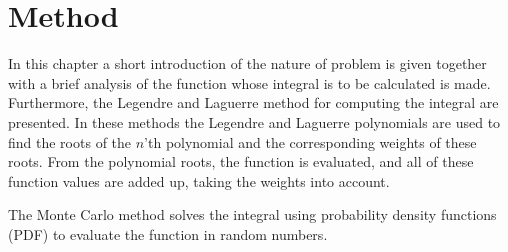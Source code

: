 \chapter{Method}
\label{chap:method} 
In this chapter a short introduction of the nature of problem is given together with a brief analysis of the function whose integral is to be calculated is made. 
Furthermore, the Legendre and Laguerre method for computing the integral are presented. In these methods the Legendre and Laguerre polynomials are used to find the roots of the $n$'th polynomial and the corresponding weights of these roots. 
From the polynomial roots, the function is evaluated, and all of these function values are added up, taking the weights into account. 

The Monte Carlo method solves the integral using probability density functions (PDF) to evaluate the function in random numbers. 
